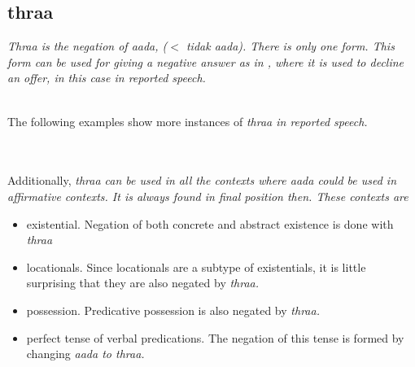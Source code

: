 \subsection{thraa}\label{sec:wc:thraa}
\em Thraa \em is the negation of \em aada\em, ($<$ \em tidak aada\em \citet[26][cf.]{Adelaar1991}). There is only one form. This form can be used for giving a negative answer as in , where it is used to decline an offer, in this case in reported speech.


 \\
The following examples show more instances of \em thraa \em in reported speech.

\\

\\


Additionally, \em thraa \em can be used in all the contexts where \em aada \em could be used in affirmative contexts. It is always found in final position then. These contexts are
\begin{itemize}
	\item existential. Negation of both concrete and abstract existence is done with \em thraa\em
	\item locationals. Since locationals are a subtype of existentials, it is little surprising that they are also negated by \em thraa\em.
	\item possession. Predicative possession is also negated by \em thraa\em.
	\item perfect tense of verbal predications. The negation of this tense is formed by changing \em aada \em to \em thraa\em.
\end{itemize}

